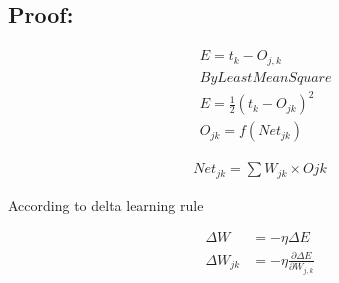 \documentclass[12pt, right open]{memoir}
\begin{document}
\subsection{Proof:}

\begin{align*}
&E = t_k - O_{j,k} \\
&By Least Mean Square \\
&E = \frac{1}{2}(t_k-O_{jk})^2 \\
&O_{jk} = f(Net_{jk})
\end{align*}

\begin{align}
Net_{jk} = \sum W_{jk} \times O{jk}
\end{align}

According to delta learning rule

\begin{align*}
\Delta W &= - \eta \Delta E \\
\Delta W_{jk} &= - \eta \frac{\partial \Delta E}{\partial W_{j,k}} \\
\end{align*}
\end{document}
